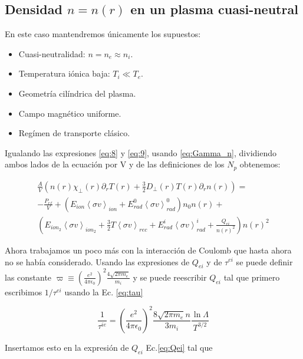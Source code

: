 \subsection{Densidad $n = n(r)$ en un plasma cuasi-neutral}

  En este caso mantendremos \'unicamente los supuestos:

  \begin{itemize}
    \item Cuasi-neutralidad: $n = n_e \approx n_i$.
    \item Temperatura i\'onica baja: $T_i \ll T_e$.
    \item Geometr\'ia cil\'indrica del plasma.
    \item Campo magn\'etico uniforme.
    \item Reg\'imen de transporte clásico.
  \end{itemize}

  Igualando las expresiones \eqref{eq:8} y \eqref{eq:9}, usando \eqref{eq:Gamma_n}, dividiendo ambos lados de la ecuaci\'on por V y de las definiciones de los $N_p$ obtenemos:

  \begin{eqnarray*}
  \frac{A}{V}\left(n(r)\chi_\perp(r)\partial_r T(r) + \frac{3}{2}D_\perp(r) T(r) \partial_r n(r)\right) = \\
  -\frac{P_{rf}}{V} + (E_{ion}\left<\sigma v\right>_{ion} + E_{rad}^0\left<\sigma v\right>_{rad}^0)n_0 n(r) + \\ \left(E_{ion_2}\left<\sigma v\right>_{ion_2} + \frac{3}{2}T\left<\sigma v\right>_{rec} + E_{rad}^i\left<\sigma v\right>_{rad}^i + \frac{Q_{ei}}{n(r)^2}\right)n(r)^2
\end{eqnarray*}

Ahora trabajamos un poco m\'as con la interacci\'on de Coulomb que hasta ahora no se hab\'ia considerado. Usando las expresiones de $Q_{ei}$ y de $\tau^{ei}$ se puede definir las constante $\varpi \equiv \left(\frac{e^2}{4\pi\epsilon_0}\right)^2\frac{4\sqrt{2\pi m_e}}{m_i}$ y se puede reescribir $Q_{ei}$ tal que primero escribimos $1 / \tau^{ei}$ usando la Ec. \eqref{eq:tau}

  \begin{equation*}
    \frac{1}{\tau^{ie}} = \left(\frac{e^2}{4\pi\epsilon_0}\right)^2\frac{8\sqrt{2\pi m_e}n}{3 m_i}\frac{\ln{\Lambda}}{T^{3/2}}
  \end{equation*} 

  Insertamos esto en la expresi\'on de $Q_{ei}$ Ec.\eqref{eq:Qei} tal que 

